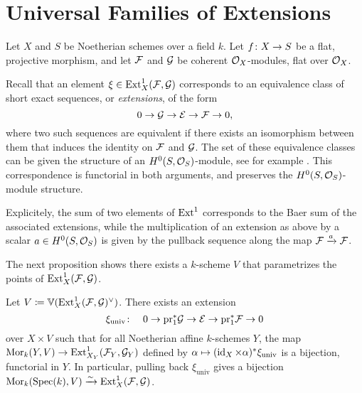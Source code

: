 \section{Universal Families of Extensions}

Let $X$ and $S$ be Noetherian schemes over a field $k$. Let $f \colon X \to S$ be a flat, projective morphism, and let $\mathcal{F}$ and $\mathcal{G}$ be coherent $\mathcal{O}_X$-modules, flat over $\mathcal{O}_X$.

Recall that an element $\xi \in \operatorname{Ext}^1_{X}(\mathcal{F},\mathcal{G})$ corresponds to an equivalence class of short exact sequences, or \emph{extensions}, of the form
\[
	0 \to \mathcal{G} \to \mathcal{E} \to \mathcal{F} \to 0,
\]
where two such sequences are equivalent if there exists an isomorphism between them that induces the identity on $\mathcal{F}$ and $\mathcal{G}$. The set of these equivalence classes can be given the structure of an $H^0(S,\mathcal{O}_S)$-module, see for example \cite[{}3.4]{weibel-homological-algebra}. This correspondence is functorial in both arguments, and preserves the $H^0(S, \mathcal{O}_S)$-module structure.

Explicitely, the sum of two elements of $\operatorname{Ext}^1$ corresponds to the Baer sum of the associated extensions, while the multiplication of an extension
as above by a scalar $a\in H^0(S,\mathcal{O}_S)$ is given by the pullback sequence along the map $\mathcal{F}\xrightarrow{a}\mathcal{F}$.

The next proposition shows there exists a $k$-scheme $V$ that parametrizes the points of $\operatorname{Ext}^{1}_X(\mathcal{F},\mathcal{G})$.

\begin{proposition} \label{cor:universal-extension}
Let $V \coloneqq \mathbb{V}(\operatorname{Ext}^1_X(\mathcal{F},\mathcal{G})^\vee)$. There exists an extension
	\[
		\xi_{\mathrm{univ}} \colon \quad 0 \to \mathrm{pr}_1^{*}\mathcal{G} \to \mathcal{E} \to \mathrm{pr}_1^{*}\mathcal{F} \to 0
	\]
over $X\times V$
such that for all Noetherian affine $k$-schemes $Y$, the map
$\operatorname{Mor}_{k}(Y,V)\to\operatorname{Ext}^1_{X_Y}(\mathcal{F}_Y,\mathcal{G}_Y)$ defined by
$\alpha \mapsto (\operatorname{id}_X\times \alpha)^{*} \xi_{\mathrm{univ}}$
is a bijection, functorial in $Y$.
In particular, pulling back $\xi_{\text{univ}}$ gives a bijection $\operatorname{Mor}_{k}(\operatorname{Spec}(k),V)\xrightarrow{\sim} \operatorname{Ext}^1_{X}(\mathcal{F},\mathcal{G})$.
\end{proposition}

